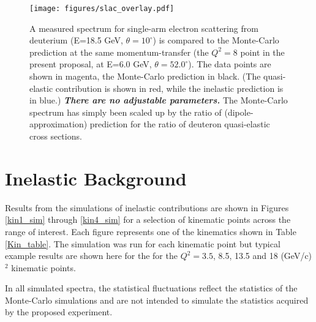 \documentclass[12pt,letterpaper,oneside]{article}
\begin{document}
\begin{figure}
\begin{center}
\texttt{[image: figures/slac\_overlay.pdf]}\\
\end{center}
\caption{\label{slac_overlay}
A measured spectrum \cite{SLAC_Rock} for single-arm electron
scattering from  deuterium (E=18.5 GeV, $\theta=10^\circ$) is compared
to the Monte-Carlo prediction at the same momentum-transfer (the
$Q^2=8$ point in the present proposal, at E=6.0 GeV,
$\theta=52.0^\circ$).  The data points are shown in magenta, the
Monte-Carlo prediction in black.  (The quasi-elastic contribution is
shown in red, while the inelastic prediction is in blue.) 
{\em\bf There are no adjustable parameters.}  The
Monte-Carlo spectrum has simply been scaled up by the ratio of
(dipole-approximation) prediction for the ratio of deuteron
quasi-elastic cross sections.
}
\end{figure}




\section{Inelastic Background}

\label{inelastic}
Results from the simulations of inelastic contributions are
shown in Figures \ref{kin1_sim} through \ref{kin4_sim} for a selection
of kinematic points across the range of interest.  Each figure
represents one of the kinematics shown in Table \ref{Kin_table}.  
The simulation was run for each kinematic point but typical example 
results are shown here for the 
for the $Q^2=3.5$, 8.5, 13.5 and 18
(GeV/c)$^2$ kinematic points. 



In all simulated spectra, the statistical
fluctuations reflect the statistics of the Monte-Carlo simulations
and are not intended to simulate the statistics acquired by the
proposed experiment.
\end{document}
